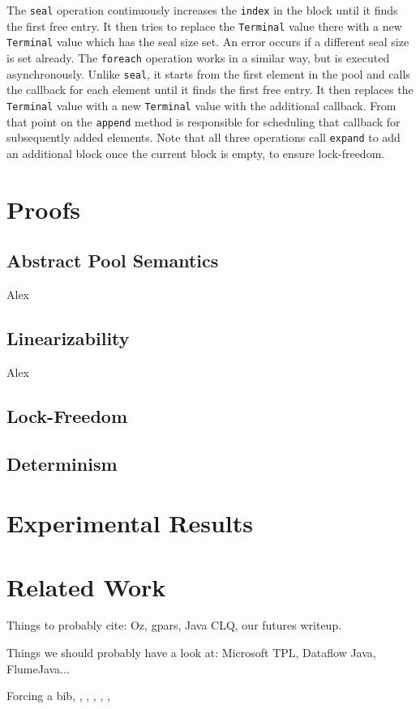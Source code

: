 \documentclass[runningheads,a4paper]{llncs}
\begin{document}
The \verb=seal= operation continuously increases the \verb=index= in the block
until it finds the first free entry. It then tries to replace the \verb=Terminal=
value there with a new \verb=Terminal= value which has the seal size set.
An error occurs if a different seal size is set already. The \verb=foreach=
operation works in a similar way, but is executed asynchronously. Unlike
\verb=seal=, it starts from the first element in the pool and calls the
callback for each element until it finds the first free entry.
It then replaces the \verb=Terminal= value with a new \verb=Terminal=
value with the additional callback. From that point on the \verb=append=
method is responsible for scheduling that callback for subsequently added elements.
Note that all three operations call \verb=expand= to add an additional
block once the current block is empty, to ensure lock-freedom.


\section{Proofs}
\subsection{Abstract Pool Semantics}
Alex
\subsection{Linearizability}
Alex
\subsection{Lock-Freedom}

\subsection{Determinism}

\section{Experimental Results}

\section{Related Work}
Things to probably cite: Oz, gpars, Java CLQ, our futures writeup.

Things we should probably have a look at: Microsoft TPL, Dataflow
Java, FlumeJava...

Forcing a bib, \cite{bowman:reasoning}, \cite{braams:babel}, \cite{clark:pct}, \cite{herlihy:methodology}, \cite{Lamport:LaTeX}, \cite{salas:calculus}
\end{document}
